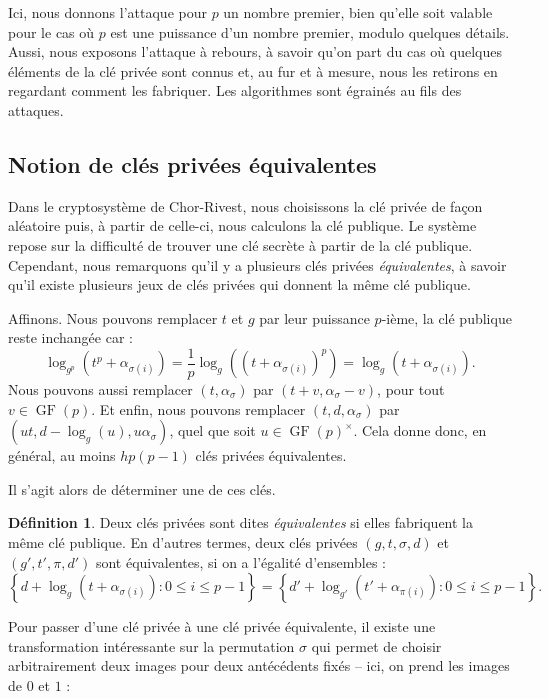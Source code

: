 \documentclass[a4paper, titlepage, 11pt]{article}
\theoremstyle{definition}
\newtheorem{defi}[theo]{Définition}
\theoremstyle{remark}
\def\gf{\operatorname{GF}}
\begin{document}
Ici, nous donnons l'attaque pour $p$ un nombre premier, bien qu'elle soit valable pour le cas où $p$ est une puissance d'un nombre premier, modulo quelques détails. Aussi, nous exposons l'attaque à rebours, à savoir qu'on part du cas où quelques éléments de la clé privée sont connus et, au fur et à mesure, nous les retirons en regardant comment les fabriquer. Les algorithmes sont égrainés au fils des attaques.

\subsection*{Notion de clés privées équivalentes}

Dans le cryptosystème de Chor-Rivest, nous choisissons la clé privée de façon aléatoire puis, à partir de celle-ci, nous calculons la clé publique. Le système repose sur la difficulté de trouver une clé secrète à partir de la clé publique. Cependant, nous remarquons qu'il y a plusieurs clés privées \textit{équivalentes}, à savoir qu'il existe plusieurs jeux de clés privées qui donnent la même clé publique.

Affinons. Nous pouvons remplacer $t$ et $g$ par leur puissance $p$-ième, la clé publique reste inchangée car :
$$\log_{g^p}\left(t^p + \alpha_{\sigma(i)}\right) = \frac{1}{p}\log_{g}\left(\left(t + \alpha_{\sigma(i)}\right)^p\right) = \log_{g}\left(t + \alpha_{\sigma(i)}\right).$$
Nous pouvons aussi remplacer $(t, \alpha_{\sigma})$ par $(t + v, \alpha_{\sigma} - v)$, pour tout $v \in \gf(p)$. Et enfin, nous pouvons remplacer $(t,d,\alpha_\sigma)$ par $(ut, d - \log_g(u), u\alpha_\sigma)$, quel que soit $u \in \gf(p)^\times$.
Cela donne donc, en général, au moins $hp(p-1)$ clés privées équivalentes. 

Il s'agit alors de déterminer une de ces clés.


\begin{defi}
Deux clés privées sont dites \textit{équivalentes} si elles fabriquent la même clé publique. En d'autres termes, deux clés privées $(g,t,\sigma,d)$ et $(g',t',\pi ,d')$ sont équivalentes, si on a l'égalité d'ensembles :
$$\left\{d + \log_g(t + \alpha_{\sigma(i)}) : 0\leqslant i \leqslant p-1\right\} = \left\{d' + \log_{g'}(t' + \alpha_{\pi(i)}) : 0\leqslant i \leqslant p-1\right\}.$$
\end{defi}

Pour passer d'une clé privée à une clé privée équivalente, il existe une transformation intéressante sur la permutation $\sigma$ qui permet de choisir arbitrairement deux images pour deux antécédents fixés -- ici, on prend les images de $0$ et $1$ :
\end{document}
